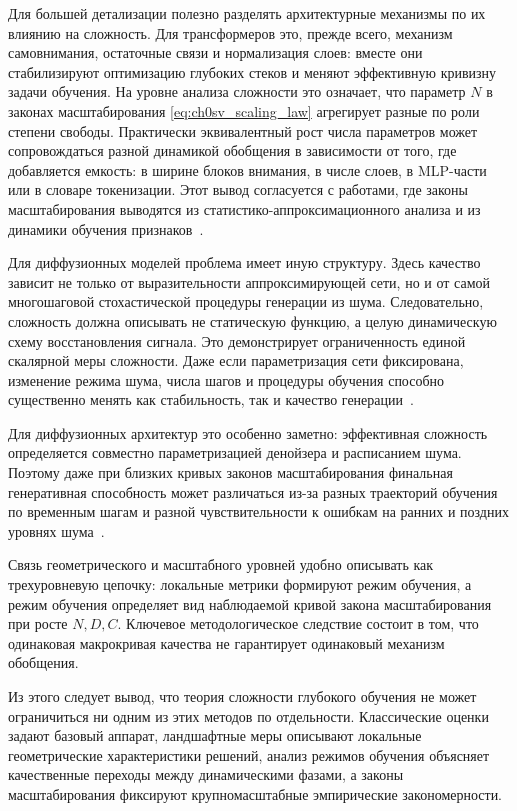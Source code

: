 Для большей детализации полезно разделять архитектурные механизмы по их влиянию на сложность. Для трансформеров это, прежде всего, механизм самовнимания, остаточные связи и нормализация слоев: вместе они стабилизируют оптимизацию глубоких стеков и меняют эффективную кривизну задачи обучения. На уровне анализа сложности это означает, что параметр $N$ в законах масштабирования \eqref{eq:ch0sv_scaling_law} агрегирует разные по роли степени свободы. Практически эквивалентный рост числа параметров может сопровождаться разной динамикой обобщения в зависимости от того, где добавляется емкость: в ширине блоков внимания, в числе слоев, в MLP-части или в словаре токенизации.
Этот вывод согласуется с работами, где законы масштабирования выводятся из статистико-аппроксимационного анализа и из динамики обучения признаков~\cite{transformerScalingLowDim2024,transformerScalingStatApprox2022,featureDynamicsScaling2025}.

Для диффузионных моделей проблема имеет иную структуру.
Здесь качество зависит не только от выразительности аппроксимирующей сети, но и от самой многошаговой стохастической процедуры генерации из шума.
Следовательно, сложность должна описывать не статическую функцию, а целую динамическую схему восстановления сигнала.
Это демонстрирует ограниченность единой скалярной меры сложности.
Даже если параметризация сети фиксирована, изменение режима шума, числа шагов и процедуры обучения способно существенно менять как стабильность, так и качество генерации~\cite{ho2020denoising}.

Для диффузионных архитектур это особенно заметно: эффективная сложность определяется совместно параметризацией денойзера и расписанием шума. Поэтому даже при близких кривых законов масштабирования финальная генеративная способность может различаться из-за разных траекторий обучения по временным шагам и разной чувствительности к ошибкам на ранних и поздних уровнях шума~\cite{diffusionTransformerScaling2024}.

Связь геометрического и масштабного уровней удобно описывать как трехуровневую цепочку: локальные метрики формируют режим обучения, а режим обучения определяет вид наблюдаемой кривой закона масштабирования при росте $N,D,C$. Ключевое методологическое следствие состоит в том, что одинаковая макрокривая качества не гарантирует одинаковый механизм обобщения.

Из этого следует вывод, что теория сложности глубокого обучения не может ограничиться ни одним из этих методов по отдельности.
Классические оценки задают базовый аппарат, ландшафтные меры описывают локальные геометрические характеристики решений, анализ режимов обучения объясняет качественные переходы между динамическими фазами, а законы масштабирования фиксируют крупномасштабные эмпирические закономерности.

